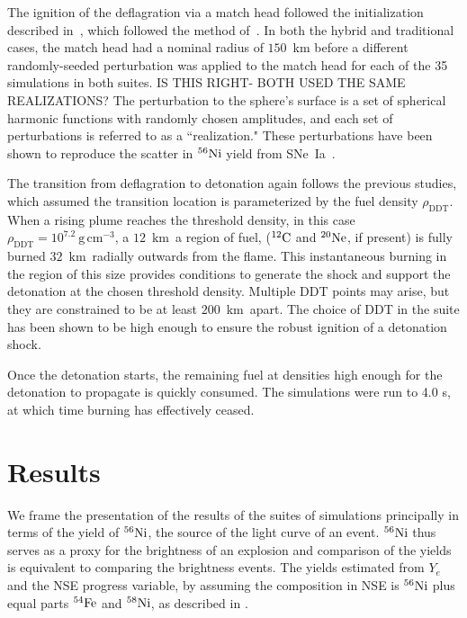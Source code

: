 \documentclass[iop,apj]{emulateapj}
\newcommand{\SNeIa}{SNe~Ia}
\newcommand{\C}[1]{\ensuremath{{}^{#1}{\rm C}}}
\newcommand{\Ne}[1]{\ensuremath{{}^{#1}{\rm Ne}}}
\newcommand{\Ni}[1]{\ensuremath{{}^{#1}{\rm Ni}}}
\newcommand{\Fe}[1]{\ensuremath{{}^{#1}{\rm Fe}}}
\newcommand{\unitspace}{\ensuremath{\,}}
\newcommand{\usp}{\unitspace}
\newcommand{\unitstyle}[1]{\ensuremath{\mathrm{#1}}}
\newcommand{\power}[2]{\ensuremath{{#1}^{#2}}}
\newcommand{\centi}{\unitstyle{c}}
\newcommand{\kilo}{\unitstyle{k}}
\newcommand{\meter}{\unitstyle{m}}
\newcommand{\cm}{\centi\meter}
\newcommand{\gram}{\unitstyle{g}}
\newcommand{\grampercc}{\gram\usp\power{\cm}{-3}} %
\newcommand{\km}{\kilo\meter}   %
\begin{document}
The ignition of the deflagration via a match head followed the 
initialization described in~\citet{kruegetal12}, which
followed the method of~\citet{townetal2009}.
In both the hybrid and traditional cases, the match head had a 
nominal radius of $150$~km before 
a different randomly-seeded perturbation was applied to the 
match head for each of the 35 simulations in both suites. {\color{red}
IS THIS RIGHT- BOTH USED THE SAME REALIZATIONS?}
The perturbation to the sphere's surface is a set of
spherical harmonic functions with randomly chosen amplitudes, and
each set of perturbations is referred to as a ``realization." 
These perturbations have been shown to reproduce 
the scatter in \Ni{56} 
yield from \SNeIa\ \citet{townetal2009}.


The transition from deflagration to detonation again follows
the previous studies, which assumed the transition location
is parameterized by the fuel density $\rho_{\mathrm{DDT}}$.
When a rising
plume reaches the threshold density, in this case
$\rho_{\mathrm{DDT}} = 10^{7.2}~\grampercc$, 
a $12$~\km\ a region of fuel, (\C{12} and \Ne{20}, if present) is
fully burned $32$~\km\ radially outwards from the flame. This
instantaneous burning in the region of this size provides conditions
to generate the shock and support the detonation at the chosen
threshold density.  Multiple DDT points may arise, but they are
constrained to be at least $200$~\km\ apart. The choice of DDT
in the suite has been shown to be high enough to ensure 
the robust ignition of a detonation shock.

Once the detonation starts, the remaining fuel at densities
high enough for the detonation to propagate is quickly consumed.
The simulations were run to 4.0 s, at which time burning 
has effectively ceased. 


\section{Results}

We frame the presentation of the results of the suites of simulations 
principally in terms of the yield of \Ni{56}, the source of 
the light curve of an event. \Ni{56} thus serves as a proxy
for the brightness of an explosion and comparison of the yields
is equivalent to comparing the brightness events. The
yields estimated from $Y_e$ and the NSE progress
variable, by assuming the composition in NSE is \Ni{56} plus equal
parts \Fe{54} and \Ni{58}, as described in
\citet{townetal2009,Meaketal09}.
\end{document}
